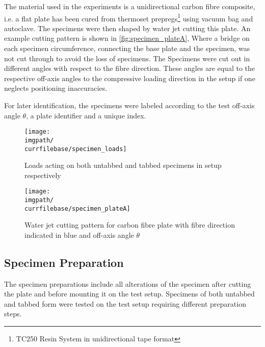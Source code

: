 The material used in the experiments is a unidirectional carbon fibre composite, i.e. a flat plate has been cured from thermoset prepregs\footnote{TC250 Resin System in unidirectional tape format} using vacuum bag and autoclave. The specimens were then shaped by water jet cutting this plate. An example cutting pattern is shown in \autoref{fig:specimen_plateA}, Where a bridge on each specimen circumference, connecting the base plate and the specimen, was not cut through to avoid the loss of specimens.
The Specimens were cut out in different angles with respect to the fibre direction. These angles are equal to the respective off-axis angles to the compressive loading direction in the setup if one neglects positioning inaccuracies.

For later identification, the specimens were labeled according to the test off-axis angle $\theta$, a plate identifier and a unique index.

\begin{figure}[!ht]
    \centering
    \texttt{[image: \\imgpath/\\currfilebase/specimen\_loads]}
    \caption{Loads acting on both untabbed and tabbed specimens in setup respectively}
    \label{fig:specimen_loads}
\end{figure}
\begin{figure}[!ht]
    \centering
    \texttt{[image: \\imgpath/\\currfilebase/specimen\_plateA]}
    \caption{Water jet cutting pattern for carbon fibre plate with fibre direction indicated in blue and off-axis angle $\theta$}
    \label{fig:specimen_plateA}
\end{figure}

\subsection{Specimen Preparation}
\label{subsec:spec_prep}

The specimen preparations include all alterations of the specimen after cutting the plate and before mounting it on the test setup. Specimens of both untabbed and tabbed form were tested on the test setup requiring different preparation steps.

